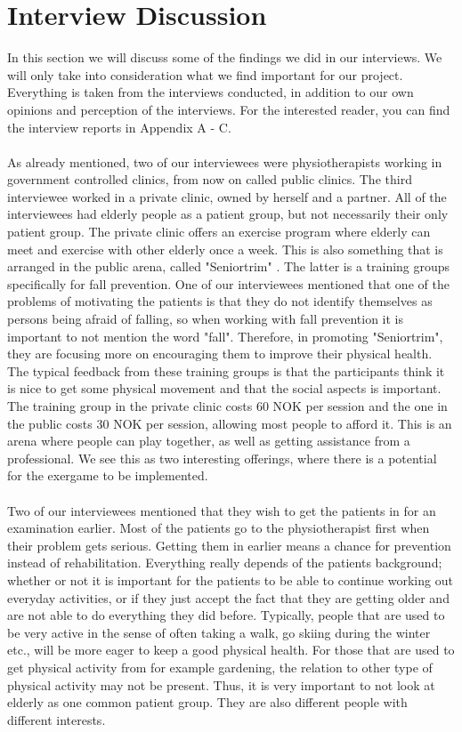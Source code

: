 \section{Interview Discussion}
In this section we will discuss some of the findings we did in our interviews. We will only take into consideration what we find important for our project. Everything is taken from the interviews conducted, in addition to our own opinions and perception of the interviews. For the interested reader, you can find the interview reports in Appendix A - C.\\ \\
As already mentioned, two of our interviewees were physiotherapists working in government controlled clinics, from now on called public clinics. The third interviewee worked in a private clinic, owned by herself and a partner. All of the interviewees had elderly people as a patient group, but not necessarily their only patient group. The private clinic offers an exercise program where elderly can meet and exercise with other elderly once a week. This is also something that is arranged in the public arena, called "Seniortrim" \cite{trim}. The latter is a training groups specifically for fall prevention. One of our interviewees mentioned that one of the problems of motivating the patients is that they do not identify themselves as  persons being afraid of falling, so when working with fall prevention it is important to not mention the word "fall". Therefore, in promoting "Seniortrim", they are focusing more on encouraging them to improve their physical health. The typical feedback from these training groups is that the participants think it is nice to get some physical movement and that the social aspects is important. The training group in the private clinic costs 60 NOK per session and the one in the public costs 30 NOK per session, allowing most people to afford it. This is an arena where people can play together, as well as getting assistance from a professional. We see this as two interesting offerings, where there is a potential for the exergame to be implemented.  \\ \\
Two of our interviewees mentioned that they wish to get the patients in for an examination earlier. Most of the patients go to the physiotherapist first when their problem gets serious. Getting them in earlier means a chance for prevention instead of rehabilitation. Everything really depends of the patients background; whether or not it is important for the patients to be able to continue working out everyday activities, or if they just accept the fact that they are getting older and are not able to do everything they did before. Typically, people that are used to be very active in the sense of often taking a walk, go skiing during the winter etc., will be more eager to keep a good physical health. For those that are used to get physical activity from for example gardening, the relation to other type of physical activity may not be present. Thus, it is very important to not look at elderly as one common patient group. They are also different people with different interests.\\ \\
